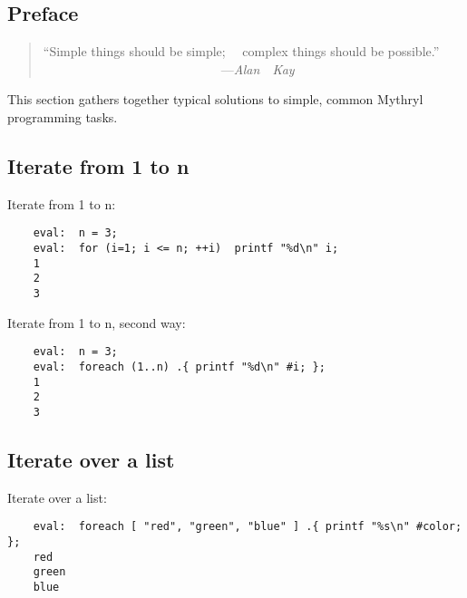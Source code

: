\label{section:tut:recipes}

\subsection{Preface}
\label{section:tut:recipes:preface}

\begin{quote}\begin{tiny}
       ``Simple things should be simple;\newline
         ~~complex things should be possible.''\newline
         ~~~~~~~~~~~~~~~~~~~~~~~~~~~~---{\em Alan~~Kay}
\end{tiny}\end{quote}

This section gathers together typical solutions to simple, common Mythryl programming tasks.
\cutend*

\subsection{Iterate from 1 to n}

Iterate from 1 to n:
\begin{verbatim}
    eval:  n = 3;
    eval:  for (i=1; i <= n; ++i)  printf "%d\n" i;
    1
    2
    3
\end{verbatim}

Iterate from 1 to n, second way:
\begin{verbatim}
    eval:  n = 3;
    eval:  foreach (1..n) .{ printf "%d\n" #i; };
    1
    2
    3
\end{verbatim}

\cutend*

\subsection{Iterate over a list}

Iterate over a list:
\begin{verbatim}
    eval:  foreach [ "red", "green", "blue" ] .{ printf "%s\n" #color; };
    red
    green
    blue
\end{verbatim}

